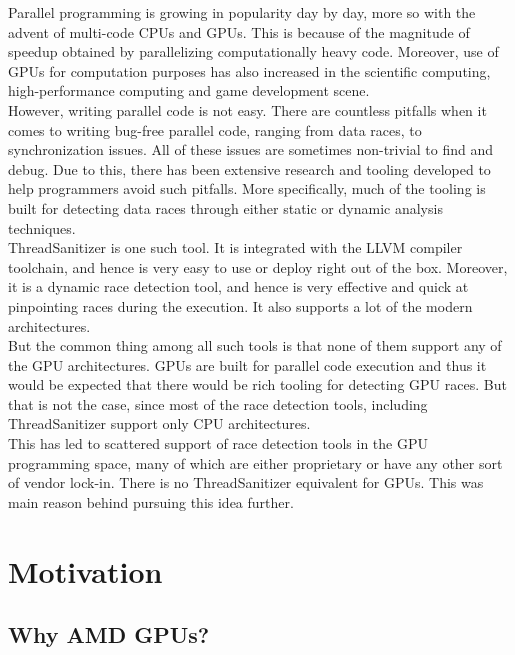 \documentclass{btp}
\begin{document}
Parallel programming is growing in popularity day by day, more so with the advent of multi-code CPUs and GPUs. This is because of the magnitude of speedup obtained by parallelizing computationally heavy code. Moreover, use of GPUs for computation purposes has also increased in the scientific computing, high-performance computing and game development scene.
\\
\newline
However, writing parallel code is not easy. There are countless pitfalls when it comes to writing bug-free parallel code, ranging from data races, to synchronization issues. All of these issues are sometimes non-trivial to find and debug. Due to this, there has been extensive research and tooling developed to help programmers avoid such pitfalls. More specifically, much of the tooling is built for detecting data races through either static or dynamic analysis techniques.
\\
\newline
ThreadSanitizer \cite{tsan-llvm} is one such tool. It is integrated with the LLVM compiler toolchain, and hence is very easy to use or deploy right out of the box. Moreover, it is a dynamic race detection tool, and hence is very effective and quick at pinpointing races during the execution. It also supports a lot of the modern architectures.
\\
\newline
But the common thing among all such tools is that none of them support any of the GPU architectures. GPUs are built for parallel code execution and thus it would be expected that there would be rich tooling for detecting GPU races. But that is not the case, since most of the race detection tools, including ThreadSanitizer support only CPU architectures.
\\
\newline
This has led to scattered support of race detection tools in the GPU programming space, many of which are either proprietary or have any other sort of vendor lock-in. There is no ThreadSanitizer equivalent for GPUs. This was main reason behind pursuing this idea further.

\section{Motivation}

\subsection{Why AMD GPUs?}
\end{document}
